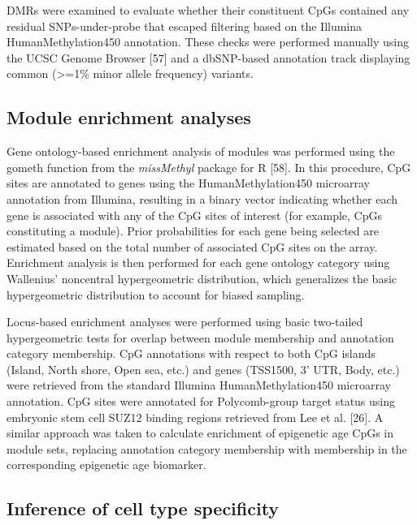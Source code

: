 \documentclass[]{bmcart}
\theoremstyle{definition}
\theoremstyle{definition}
\theoremstyle{definition}
\theoremstyle{remark}
\begin{document}
DMRs were examined to evaluate whether their constituent CpGs contained
any residual SNPs-under-probe that escaped filtering based on the
Illumina HumanMethylation450 annotation. These checks were performed
manually using the UCSC Genome Browser {[}57{]} and a dbSNP-based
annotation track displaying common (\textgreater{}=1\% minor allele
frequency) variants.

\subsection{Module enrichment
analyses}\label{module-enrichment-analyses}

Gene ontology-based enrichment analysis of modules was performed using
the gometh function from the \emph{missMethyl} package for R {[}58{]}.
In this procedure, CpG sites are annotated to genes using the
HumanMethylation450 microarray annotation from Illumina, resulting in a
binary vector indicating whether each gene is associated with any of the
CpG sites of interest (for example, CpGs constituting a module). Prior
probabilities for each gene being selected are estimated based on the
total number of associated CpG sites on the array. Enrichment analysis
is then performed for each gene ontology category using Wallenius'
noncentral hypergeometric distribution, which generalizes the basic
hypergeometric distribution to account for biased sampling.

Locus-based enrichment analyses were performed using basic two-tailed
hypergeometric tests for overlap between module membership and
annotation category membership. CpG annotations with respect to both CpG
islands (Island, North shore, Open sea, etc.) and genes (TSS1500, 3'
UTR, Body, etc.) were retrieved from the standard Illumina
HumanMethylation450 microarray annotation. CpG sites were annotated for
Polycomb-group target status using embryonic stem cell SUZ12 binding
regions retrieved from Lee et al. {[}26{]}. A similar approach was taken
to calculate enrichment of epigenetic age CpGs in module sets, replacing
annotation category membership with membership in the corresponding
epigenetic age biomarker.

\subsection{Inference of cell type
specificity}\label{inference-of-cell-type-specificity}
\end{document}
